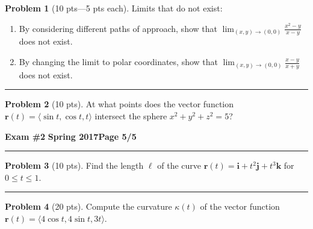 \documentclass[12pt]{article}
\theoremstyle{definition}
\newtheorem{problem}{Problem}
\begin{document}
\begin{problem}[10 pts---5 pts each]
Limits that do not exist:
\begin{enumerate}
  \item By considering different paths of approach, show that $\displaystyle{\lim_{(x,y) \to (0,0)} \frac{x^2-y}{x-y}}$ does not exist.
  \vspace{4.5cm}
  \item By changing the limit to polar coordinates, show that $\displaystyle{\lim_{(x,y) \to (0,0)} \frac{x-y}{x+y}}$ does not exist.
  \vspace{4.5cm}
\end{enumerate}
\end{problem}
\hrule
\begin{problem}[10 pts]
At what points does the vector function $\boldsymbol{r}(t) = \langle \sin t, \cos t, t \rangle$ intersect the sphere $x^2+y^2+z^2 = 5$?
\vspace{7cm}
\begin{flushright}
\end{flushright}
\end{problem}
\newpage

\hfill{\large\bf Exam \#2}\hfill{\large\bf
  Spring 2017}\hfill{\large\bf Page 5/5}\hrule

\bigskip
\begin{problem}[10 pts]
Find the length $\ell$ of the curve $\boldsymbol{r}(t) = \boldsymbol{i} + t^2 \boldsymbol{j} + t^3 \boldsymbol{k}$ for $0 \leq t \leq 1$.
\vspace{9cm}
\begin{flushright}
\end{flushright}
\end{problem}
\hrule
\begin{problem}[20 pts]
Compute the curvature $\kappa(t)$ of the vector function $\boldsymbol{r}(t) = \langle 4\cos t, 4\sin t, 3t \rangle$.
\vspace{9cm}
\begin{flushright}
\end{flushright}
\end{problem}
\end{document}
